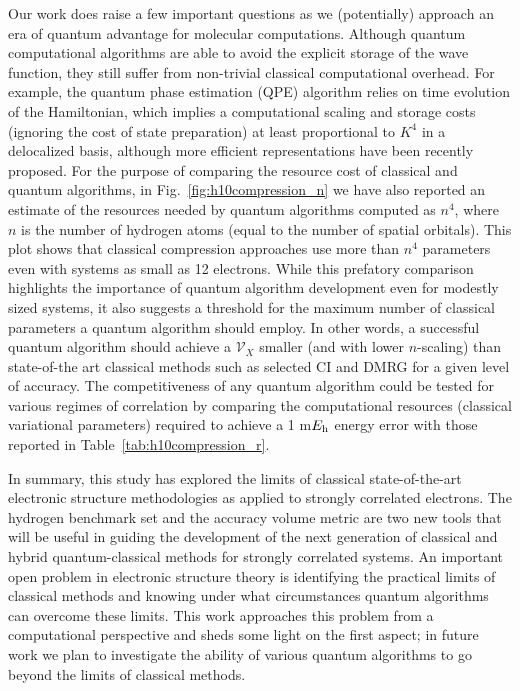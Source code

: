 \documentclass[aip,jcp,amsmath,amssymb, preprint]{revtex4-1}
\newcommand*{\Eh}{$E_{\rm h}$\xspace}
\newcommand*{\ncomp}{\mathcal{V}_X}
\newcommand{\addnew}[1]{\colorbox{goodorange}{\textcolor{white}{\footnotesize  \fontfamily{phv}\selectfont +}}
\textcolor{goodorange}{{#1}}\xspace
}
\begin{document}
Our work does raise a few important questions as we (potentially) approach an era of quantum advantage for molecular computations.
Although quantum computational algorithms are able to avoid the explicit storage of the wave function, they still suffer from non-trivial classical computational overhead.
For example, the quantum phase estimation\cite{Abrams:1997ha,Abrams:1999ur}  (QPE) algorithm relies on time evolution of the Hamiltonian, which implies a computational scaling and storage costs \addnew{(ignoring the cost of state preparation)} at least proportional to $K^4$ in a delocalized basis, although more efficient representations have been recently proposed.\cite{babbush2018low,mcclean2019discontinuous}
For the purpose of comparing the resource cost of classical and quantum algorithms, in Fig.~\ref{fig:h10compression_n} we have also reported an estimate of the resources needed by quantum algorithms computed as $n^4$, where $n$ is the number of hydrogen atoms (equal to the number of spatial orbitals).
This plot shows that classical compression approaches use more than $n^4$ parameters even with systems as small as 12 electrons.
While this prefatory comparison highlights the importance of quantum algorithm development even for modestly sized systems, it also suggests a threshold for the maximum number of classical parameters a quantum algorithm should employ.
In other words, a successful quantum algorithm should achieve a $\ncomp$ smaller (and with lower $n$-scaling) than state-of-the art classical methods such as selected CI and DMRG for a given level of accuracy.
The competitiveness of any quantum algorithm could be tested for various regimes of correlation by comparing the computational resources (classical variational parameters) required to achieve a 1 m\Eh energy error with those reported in Table~\ref{tab:h10compression_r}.

In summary, this study has explored the limits of classical state-of-the-art electronic structure methodologies as applied to strongly correlated electrons.
The hydrogen benchmark set and the accuracy volume metric are two new tools that will be useful in guiding the development of the next generation of classical and hybrid quantum-classical methods for strongly correlated systems.
An important open problem in electronic structure theory is identifying the practical limits of classical methods and knowing under what circumstances quantum algorithms can overcome these limits.
This work approaches this problem from a computational perspective and sheds some light on the first aspect; in future work we plan to investigate the ability of various quantum algorithms to go beyond the limits of classical methods.
\end{document}
